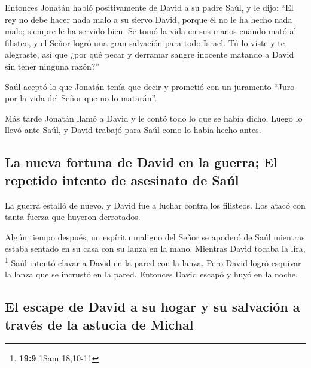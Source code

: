 Entonces Jonatán habló positivamente de David a su padre
Saúl, y le dijo: ``El rey no debe hacer nada malo a su siervo David,
porque él no le ha hecho nada malo; siempre le ha servido bien.
 Se tomó la vida en sus manos cuando mató al filisteo, y
el Señor logró una gran salvación para todo Israel. Tú lo viste y te
alegraste, así que ¿por qué pecar y derramar sangre inocente matando a
David sin tener ninguna razón?''

 Saúl aceptó lo que Jonatán tenía que decir y prometió con
un juramento ``Juro por la vida del Señor que no lo matarán''.

 Más tarde Jonatán llamó a David y le contó todo lo que se
había dicho. Luego lo llevó ante Saúl, y David trabajó para Saúl como lo
había hecho antes.

\hypertarget{la-nueva-fortuna-de-david-en-la-guerra-el-repetido-intento-de-asesinato-de-sauxfal}{%
\subsection{La nueva fortuna de David en la guerra; El repetido intento
de asesinato de
Saúl}\label{la-nueva-fortuna-de-david-en-la-guerra-el-repetido-intento-de-asesinato-de-sauxfal}}

 La guerra estalló de nuevo, y David fue a luchar contra
los filisteos. Los atacó con tanta fuerza que huyeron derrotados.

 Algún tiempo después, un espíritu maligno del Señor se
apoderó de Saúl mientras estaba sentado en su casa con su lanza en la
mano. Mientras David tocaba la lira, \footnote{\textbf{19:9} 1Sam
  18,10-11}  Saúl intentó clavar a David en la pared con
la lanza. Pero David logró esquivar la lanza que se incrustó en la
pared. Entonces David escapó y huyó en la noche.

\hypertarget{el-escape-de-david-a-su-hogar-y-su-salvaciuxf3n-a-travuxe9s-de-la-astucia-de-michal}{%
\subsection{El escape de David a su hogar y su salvación a través de la
astucia de
Michal}\label{el-escape-de-david-a-su-hogar-y-su-salvaciuxf3n-a-travuxe9s-de-la-astucia-de-michal}}

